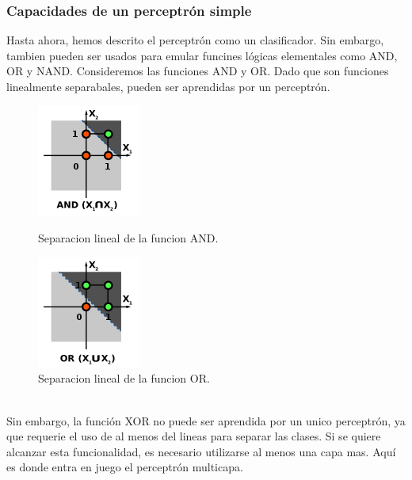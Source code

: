 \subsubsection{Capacidades de un perceptrón simple}
Hasta ahora, hemos descrito el perceptrón como un clasificador. Sin embargo, tambien pueden ser usados para emular funcines lógicas elementales como AND, OR y NAND. Consideremos las funciones AND y OR. Dado que son funciones linealmente separabales, pueden ser aprendidas por un perceptrón.
\begin{figure}[htp]
\centering
\begin{minipage}[b]{0.4\textwidth}
    \includegraphics[scale=1]{images/perceptron_and.png}
    \caption{Separacion lineal de la funcion AND.}
  \end{minipage}
\hfill
\begin{minipage}[b]{0.4\textwidth}
    \includegraphics[scale=1]{images/perceptron_or.png}
  \caption{Separacion lineal de la funcion OR.}
  \end{minipage}
\end{figure}
\\Sin embargo, la función XOR no puede ser aprendida por un unico perceptrón, ya que requerie el uso de al menos del lineas para separar las clases. Si se quiere alcanzar esta funcionalidad, es necesario utilizarse al menos una capa mas. Aquí es donde entra en juego el perceptrón multicapa.


